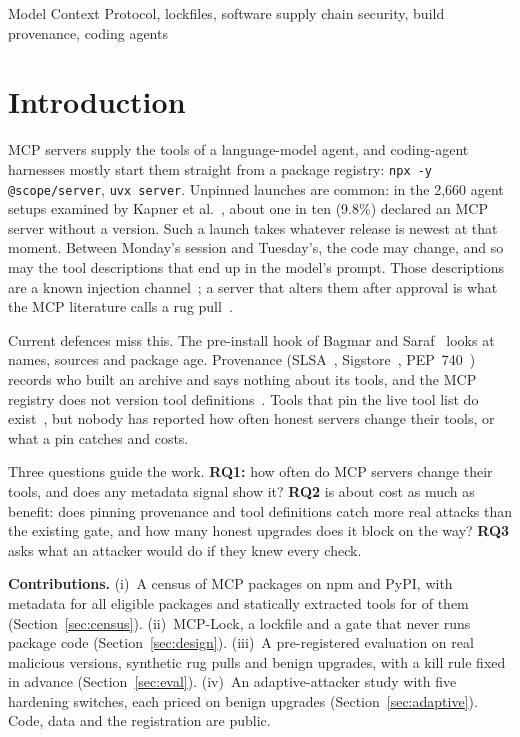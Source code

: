 \documentclass[conference]{IEEEtran}
\newcommand{\code}[1]{\texttt{#1}}
\begin{document}
\begin{IEEEkeywords}
Model Context Protocol, lockfiles, software supply chain security, build provenance, coding agents
\end{IEEEkeywords}

\section{Introduction}
MCP servers supply the tools of a language-model agent, and coding-agent harnesses mostly start them straight from a
package registry: \code{npx -y @scope/server}, \code{uvx server}. Unpinned launches are common: in the 2,660 agent
setups examined by Kapner et al.~\cite{kapner2026harness}, about one in ten (9.8\%) declared an MCP server without a
version. Such a launch takes whatever release is
newest at that moment. Between Monday's session and Tuesday's, the code may change, and so may the tool descriptions
that end up in the model's prompt. Those descriptions are a known injection channel~\cite{invariant2025poisoning}; a
server that alters them after approval is what the MCP literature calls a rug pull~\cite{invariant2025poisoning,hou2025mcp}.

Current defences miss this. The pre-install hook of Bagmar and Saraf~\cite{bagmar2026setup} looks at names, sources and
package age. Provenance (SLSA~\cite{slsa2023provenance}, Sigstore~\cite{newman2022sigstore}, PEP~740~\cite{pep740})
records who built an archive and says nothing about its tools, and the MCP registry does not version tool
definitions~\cite{kraishan2026drift}. Tools that pin the live tool list do exist~\cite{invariant2025mcpscan,mcppin,mcpseal},
but nobody has reported how often honest servers change their tools, or what a pin catches and costs.

Three questions guide the work. \textbf{RQ1:} how often do MCP servers change their tools, and does any
metadata signal show it? \textbf{RQ2} is about cost as much as benefit: does pinning provenance and tool definitions
catch more real attacks than the existing gate, and how many honest upgrades does it block on the way?
\textbf{RQ3} asks what an attacker would do if they knew every check.

\textbf{Contributions.} (i)~A census of MCP packages on npm and PyPI, with metadata for all \MetaPkgs{} eligible
packages and statically extracted tools for \CensusSample{} of them (Section~\ref{sec:census}). (ii)~MCP-Lock, a
lockfile and a gate that never runs package code (Section~\ref{sec:design}). (iii)~A pre-registered evaluation on real
malicious versions, synthetic rug pulls and benign upgrades, with a kill rule fixed in advance (Section~\ref{sec:eval}).
(iv)~An adaptive-attacker study with five hardening switches, each priced on benign upgrades (Section~\ref{sec:adaptive}).
Code, data and the registration are public.
\end{document}
